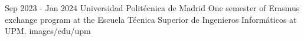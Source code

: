 {Sep 2023 - Jan 2024}
{Universidad Politécnica de Madrid}
{One semester of Erasmus exchange program at the 
Escuela Técnica Superior de Ingenieros Informáticos
at UPM.}
{images/edu/upm}
